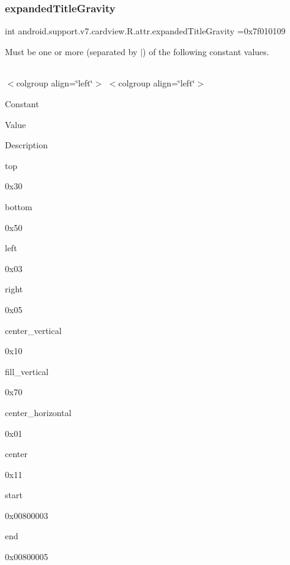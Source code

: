 \subsubsection{\texorpdfstring{expanded\+Title\+Gravity}{expandedTitleGravity}}
{\footnotesize\ttfamily int android.\+support.\+v7.\+cardview.\+R.\+attr.\+expanded\+Title\+Gravity =0x7f010109\hspace{0.3cm}{\ttfamily [static]}}

Must be one or more (separated by \textquotesingle{}$\vert$\textquotesingle{}) of the following constant values.

\tabulinesep=1mm
\begin{longtabu} spread 0pt [c]{*{0}{|X[-1]}|}
\hline
\end{longtabu}
$<$colgroup align=\char`\"{}left\char`\"{}$>$ $<$colgroup align=\char`\"{}left\char`\"{}$>$ 

Constant

Value

Description 

{\ttfamily top}

0x30

{\ttfamily bottom}

0x50

{\ttfamily left}

0x03

{\ttfamily right}

0x05

{\ttfamily center\+\_\+vertical}

0x10

{\ttfamily fill\+\_\+vertical}

0x70

{\ttfamily center\+\_\+horizontal}

0x01

{\ttfamily center}

0x11

{\ttfamily start}

0x00800003

{\ttfamily end}

0x00800005\mbox{\label{classandroid_1_1support_1_1v7_1_1cardview_1_1R_1_1attr_aea6ee7452b54b5a08a1365f1d0948dc7}} 
